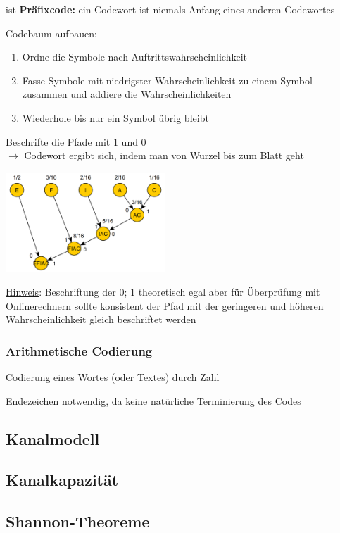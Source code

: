 ist \textbf{Präfixcode:} ein Codewort ist niemals Anfang eines anderen Codewortes

Codebaum aufbauen:
\begin{enumerate}
    \item Ordne die Symbole nach Auftrittswahrscheinlichkeit
    \item Fasse Symbole mit niedrigster Wahrscheinlichkeit zu einem Symbol zusammen und addiere die Wahrscheinlichkeiten
    \item Wiederhole bis nur ein Symbol übrig bleibt
\end{enumerate}

Beschrifte die Pfade mit 1 und 0\\
$\rightarrow$ Codewort ergibt sich, indem man von Wurzel bis zum Blatt geht

\includegraphics[width=6cm]{img/huffman.PNG}

\underline{Hinweis}: Beschriftung der 0; 1 theoretisch egal aber für Überprüfung mit Onlinerechnern
sollte konsistent der Pfad mit der geringeren und höheren Wahrscheinlichkeit gleich beschriftet
werden

\subsubsection{Arithmetische Codierung}

Codierung eines Wortes (oder Textes) durch Zahl

Endezeichen notwendig, da keine natürliche Terminierung des Codes

\subsection{Kanalmodell}

\subsection{Kanalkapazität}

\subsection{Shannon-Theoreme}

